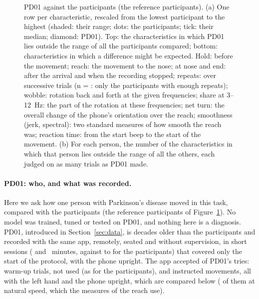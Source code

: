 \begin{figure}[tbp]
\centering
\begin{minipage}[c]{0.49\linewidth}\centering{}\end{minipage}\hfill
\begin{minipage}[c]{0.48\linewidth}
\caption{PD01 against the  participants (the reference participants). (a) One row per
characteristic, rescaled from the lowest participant to the highest (shaded: their range; dots: the participants;
tick: their median; diamond: PD01). Top: the characteristics in which PD01 lies outside the range of all the
participants compared; bottom: characteristics in which a difference might be expected. Hold: before the movement;
reach: the movement to the nose; at nose and end: after the arrival and when the recording stopped; repeats: over
successive trials (n = : only the participants with enough repeats); wobble: rotation
back and forth at the given frequencies; share at 3--12~Hz: the part of the rotation at these frequencies; net turn:
the overall change of the phone's orientation over the reach; smoothness (jerk, spectral): two standard measures of
how smooth the reach was; reaction time: from the start beep to the start of the movement. (b) For each person, the
number of the  characteristics in which that person lies outside the range of all the others,
each judged on as many trials as PD01 made.}
\label{fig:pd01}
\end{minipage}
\end{figure}

\paragraph{PD01: who, and what was recorded.} Here we ask how one person with Parkinson's disease moved in this task,
compared with the  participants (the reference participants of Figure~\ref{fig:pd01}). No model
was trained, tuned or tested on PD01, and nothing here is a diagnosis. PD01, introduced in Section~\ref{sec:data}, is
decades older than the participants and recorded with the same app, remotely, seated and without supervision, in
 short sessions ( and ~minutes, against
 to  for the participants) that covered only the start of
the protocol, with the phone upright. The app accepted  of PD01's  tries:
 warm-up trials, not used (as for the participants), and  instructed movements,
all with the left hand and the phone upright, which are compared below ( of them at
natural speed, which the measures of the reach use).

